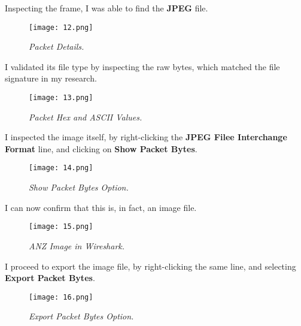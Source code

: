 Inspecting the frame, I was able to find the \textbf{JPEG} file.

\begin{figure}[H]
    \setlength{\abovecaptionskip}{20pt}
    \setlength{\belowcaptionskip}{0pt}
    \centering
    \texttt{[image: 12.png]}
    \captionsetup{justification=centering}
    \caption{\textit{Packet Details.}}
    \label{fig:12}
\end{figure}
\vspace{-10pt}

I validated its file type by inspecting the raw bytes, which matched the file signature in my research. 

\begin{figure}[H]
    \setlength{\abovecaptionskip}{20pt}
    \setlength{\belowcaptionskip}{0pt}
    \centering
    \texttt{[image: 13.png]}
    \captionsetup{justification=centering}
    \caption{\textit{Packet Hex and ASCII Values.}}
    \label{fig:13}
\end{figure}
\vspace{-10pt}

I inspected the image itself, by right-clicking the \textbf{JPEG Filee Interchange Format} line, and clicking on \textbf{Show Packet Bytes}.

\begin{figure}[H]
    \setlength{\abovecaptionskip}{20pt}
    \setlength{\belowcaptionskip}{0pt}
    \centering
    \texttt{[image: 14.png]}
    \captionsetup{justification=centering}
    \caption{\textit{Show Packet Bytes Option.}}
    \label{fig:14}
\end{figure}
\vspace{-10pt}

I can now confirm that this is, in fact, an image file.

\begin{figure}[H]
    \setlength{\abovecaptionskip}{20pt}
    \setlength{\belowcaptionskip}{0pt}
    \centering
    \texttt{[image: 15.png]}
    \captionsetup{justification=centering}
    \caption{\textit{ANZ Image in Wireshark.}}
    \label{fig:15}
\end{figure}
\vspace{-10pt}

I proceed to export the image file, by right-clicking the same line, and selecting \textbf{Export Packet Bytes}.

\begin{figure}[H]
    \setlength{\abovecaptionskip}{20pt}
    \setlength{\belowcaptionskip}{0pt}
    \centering
    \texttt{[image: 16.png]}
    \captionsetup{justification=centering}
    \caption{\textit{Export Packet Bytes Option.}}
    \label{fig:16}
\end{figure}
\vspace{-10pt}

